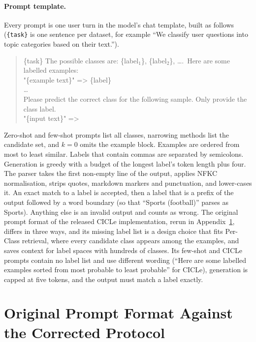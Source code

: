 \paragraph{Prompt template.}
Every prompt is one user turn in the model's chat template, built as follows (\texttt{\{task\}} is one sentence per dataset, for example ``We classify user questions into topic categories based on their text.'').
\begin{quote}\small\ttfamily
\{task\} The possible classes are: \{label$_1$\}, \{label$_2$\}, \ldots.\ Here are some labelled examples:\\[2pt]
"\{example text\}" => \{label\}\\
\ldots\\[2pt]
Please predict the correct class for the following sample. Only provide the class label.\\[2pt]
"\{input text\}" =>
\end{quote}
Zero-shot and few-shot prompts list all classes, narrowing methods list the candidate set, and $k = 0$ omits the example block. Examples are ordered from most to least similar. Labels that contain commas are separated by semicolons. Generation is greedy with a budget of the longest label's token length plus four.
The parser takes the first non-empty line of the output, applies NFKC normalisation, strips quotes, markdown markers and punctuation, and lower-cases it. An exact match to a label is accepted, then a label that is a prefix of the output followed by a word boundary (so that ``Sports (football)'' parses as Sports). Anything else is an invalid output and counts as wrong.
The original prompt format of the released CICLe implementation, rerun in Appendix~\ref{app:original}, differs in three ways, and its missing label list is a design choice that fits Per-Class retrieval, where every candidate class appears among the examples, and saves context for label spaces with hundreds of classes. Its few-shot and CICLe prompts contain no label list and use different wording (``Here are some labelled examples sorted from most probable to least probable'' for CICLe), generation is capped at five tokens, and the output must match a label exactly.

\section{Original Prompt Format Against the Corrected Protocol}
\label{app:original}

